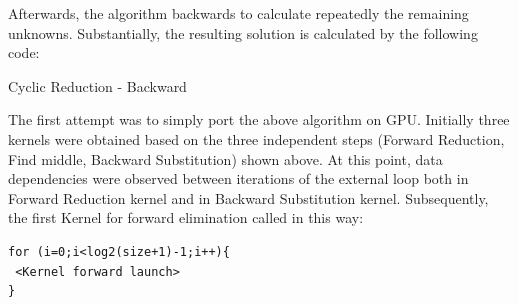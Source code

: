 Afterwards, the algorithm backwards to calculate repeatedly the remaining unknowns. Substantially, the resulting solution is calculated by the following code:
\begin{algorithm}[H]
\begin{algorithmic}[1]
        	\State{\hspace*{2cm}\}}
        	\State{\}} 
\EndFunction
\end{algorithmic}
\caption{Cyclic Reduction - Backward}
\label{alg:Backward_cr}
\end{algorithm}
The first attempt was to simply port the above algorithm on GPU. Initially three kernels were obtained based on the three independent steps (Forward Reduction, Find middle, Backward Substitution) shown above. 
At this point, data dependencies were observed  between iterations of the external loop both in Forward Reduction kernel and in Backward Substitution kernel. Subsequently, the first Kernel for forward elimination called in this way:

\begin{lstlisting}[frame=single]
for (i=0;i<log2(size+1)-1;i++){
 <Kernel forward launch>
}
\end{lstlisting}


